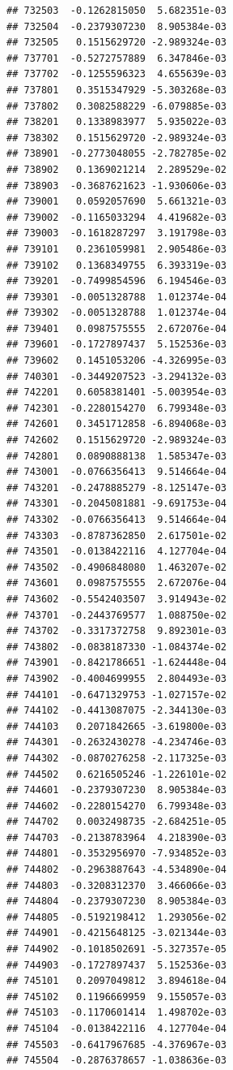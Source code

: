 \begin{frame}[fragile]
\begin{verbatim}
## 732503  -0.1262815050  5.682351e-03
## 732504  -0.2379307230  8.905384e-03
## 732505   0.1515629720 -2.989324e-03
## 737701  -0.5272757889  6.347846e-03
## 737702  -0.1255596323  4.655639e-03
## 737801   0.3515347929 -5.303268e-03
## 737802   0.3082588229 -6.079885e-03
## 738201   0.1338983977  5.935022e-03
## 738302   0.1515629720 -2.989324e-03
## 738901  -0.2773048055 -2.782785e-02
## 738902   0.1369021214  2.289529e-02
## 738903  -0.3687621623 -1.930606e-03
## 739001   0.0592057690  5.661321e-03
## 739002  -0.1165033294  4.419682e-03
## 739003  -0.1618287297  3.191798e-03
## 739101   0.2361059981  2.905486e-03
## 739102   0.1368349755  6.393319e-03
## 739201  -0.7499854596  6.194546e-03
## 739301  -0.0051328788  1.012374e-04
## 739302  -0.0051328788  1.012374e-04
## 739401   0.0987575555  2.672076e-04
## 739601  -0.1727897437  5.152536e-03
## 739602   0.1451053206 -4.326995e-03
## 740301  -0.3449207523 -3.294132e-03
## 742201   0.6058381401 -5.003954e-03
## 742301  -0.2280154270  6.799348e-03
## 742601   0.3451712858 -6.894068e-03
## 742602   0.1515629720 -2.989324e-03
## 742801   0.0890888138  1.585347e-03
## 743001  -0.0766356413  9.514664e-04
## 743201  -0.2478885279 -8.125147e-03
## 743301  -0.2045081881 -9.691753e-04
## 743302  -0.0766356413  9.514664e-04
## 743303  -0.8787362850  2.617501e-02
## 743501  -0.0138422116  4.127704e-04
## 743502  -0.4906848080  1.463207e-02
## 743601   0.0987575555  2.672076e-04
## 743602  -0.5542403507  3.914943e-02
## 743701  -0.2443769577  1.088750e-02
## 743702  -0.3317372758  9.892301e-03
## 743802  -0.0838187330 -1.084374e-02
## 743901  -0.8421786651 -1.624448e-04
## 743902  -0.4004699955  2.804493e-03
## 744101  -0.6471329753 -1.027157e-02
## 744102  -0.4413087075 -2.344130e-03
## 744103   0.2071842665 -3.619800e-03
## 744301  -0.2632430278 -4.234746e-03
## 744302  -0.0870276258 -2.117325e-03
## 744502   0.6216505246 -1.226101e-02
## 744601  -0.2379307230  8.905384e-03
## 744602  -0.2280154270  6.799348e-03
## 744702   0.0032498735 -2.684251e-05
## 744703  -0.2138783964  4.218390e-03
## 744801  -0.3532956970 -7.934852e-03
## 744802  -0.2963887643 -4.534890e-04
## 744803  -0.3208312370  3.466066e-03
## 744804  -0.2379307230  8.905384e-03
## 744805  -0.5192198412  1.293056e-02
## 744901  -0.4215648125 -3.021344e-03
## 744902  -0.1018502691 -5.327357e-05
## 744903  -0.1727897437  5.152536e-03
## 745101   0.2097049812  3.894618e-04
## 745102   0.1196669959  9.155057e-03
## 745103  -0.1170601414  1.498702e-03
## 745104  -0.0138422116  4.127704e-04
## 745503  -0.6417967685 -4.376967e-03
## 745504  -0.2876378657 -1.038636e-03

\end{verbatim}
\end{frame}
